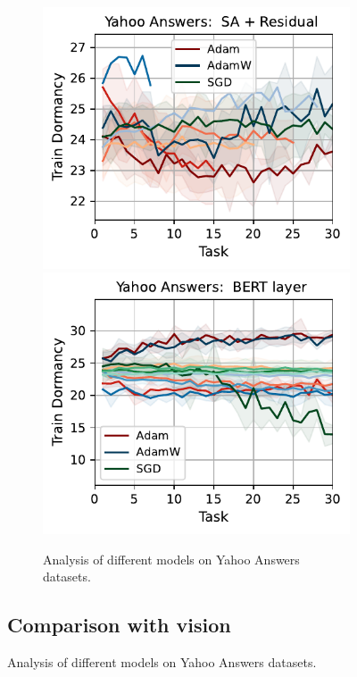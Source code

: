 \begin{figure}[htb!]
{\begin{figure}[htb!]
{        \includegraphics[width=\textwidth]{figs/Dormancy/nlp/attention_residual/yahoo_answers_40.pdf}
        \includegraphics[width=\textwidth]{figs/Dormancy/nlp/bert_layer/yahoo_answers_40.pdf}
    }
    \caption{Analysis of different models on Yahoo Answers datasets.}
    \label{fig:yahoo_models_analysis}
\end{figure}



\subsection{Comparison with vision}

}
\end{figure}
